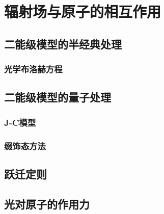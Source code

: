 \chapter{辐射场与原子的相互作用}
\section{二能级模型的半经典处理}
\subsection{光学布洛赫方程}
\section{二能级模型的量子处理}
\subsection{J-C模型}
\subsection{缀饰态方法}
\section{跃迁定则}
\section{光对原子的作用力}